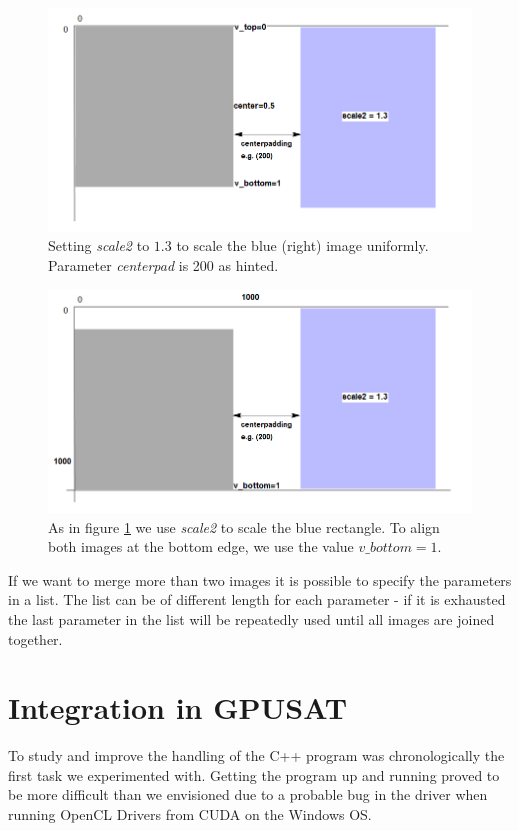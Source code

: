 \documentclass[a4paper, 12pt, bibliography=totoc]{scrartcl}
\begin{document}
\begin{figure}[H]
	\centering
	\includegraphics[width=0.8\linewidth]{images/svgjoinscaled.png}
	\caption{Setting \textit{scale2} to $1.3$ to scale the blue (right) image uniformly. Parameter \textit{centerpad} is 200 as hinted.}
	\label{fig:svgjoinscaled}
\end{figure}

\begin{figure}[H]
	\centering
	\includegraphics[width=0.8\linewidth]{images/svgjoinscaledbottom.png}
	\caption{As in figure \ref{fig:svgjoinscaled} we use \textit{scale2} to scale the blue rectangle. To align both images at the bottom edge, we use the value $v\_bottom=1$.}
	\label{fig:svgjoinscaledbottom}
\end{figure}

If we want to merge more than two images it is possible to specify the parameters in a list.
The list can be of different length for each parameter - if it is exhausted the last parameter in the list will be repeatedly used until all images are joined together.


\newpage
\section{Integration in GPUSAT}\label{sec:gpusat}
To study and improve the handling of the C++ program was chronologically the first task we experimented with.
Getting the program up and running proved to be more difficult than we envisioned due to a probable bug in the driver when running OpenCL Drivers from CUDA on the Windows OS.
\end{document}
